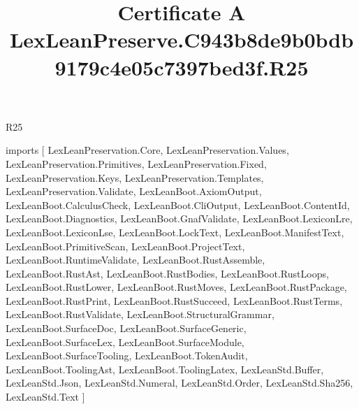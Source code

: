\begin{lexlean}{R25}
\title{Certificate A LexLeanPreserve.C943b8de9b0bdb9179c4e05c7397bed3f.R25}
\begin{coremodule}
imports [
  LexLeanPreservation.Core,
  LexLeanPreservation.Values,
  LexLeanPreservation.Primitives,
  LexLeanPreservation.Fixed,
  LexLeanPreservation.Keys,
  LexLeanPreservation.Templates,
  LexLeanPreservation.Validate,
  LexLeanBoot.AxiomOutput,
  LexLeanBoot.CalculusCheck,
  LexLeanBoot.CliOutput,
  LexLeanBoot.ContentId,
  LexLeanBoot.Diagnostics,
  LexLeanBoot.GnafValidate,
  LexLeanBoot.LexiconLre,
  LexLeanBoot.LexiconLse,
  LexLeanBoot.LockText,
  LexLeanBoot.ManifestText,
  LexLeanBoot.PrimitiveScan,
  LexLeanBoot.ProjectText,
  LexLeanBoot.RuntimeValidate,
  LexLeanBoot.RustAssemble,
  LexLeanBoot.RustAst,
  LexLeanBoot.RustBodies,
  LexLeanBoot.RustLoops,
  LexLeanBoot.RustLower,
  LexLeanBoot.RustMoves,
  LexLeanBoot.RustPackage,
  LexLeanBoot.RustPrint,
  LexLeanBoot.RustSucceed,
  LexLeanBoot.RustTerms,
  LexLeanBoot.RustValidate,
  LexLeanBoot.StructuralGrammar,
  LexLeanBoot.SurfaceDoc,
  LexLeanBoot.SurfaceGeneric,
  LexLeanBoot.SurfaceLex,
  LexLeanBoot.SurfaceModule,
  LexLeanBoot.SurfaceTooling,
  LexLeanBoot.TokenAudit,
  LexLeanBoot.ToolingAst,
  LexLeanBoot.ToolingLatex,
  LexLeanStd.Buffer,
  LexLeanStd.Json,
  LexLeanStd.Numeral,
  LexLeanStd.Order,
  LexLeanStd.Sha256,
  LexLeanStd.Text
]


\end{coremodule}
\end{lexlean}
